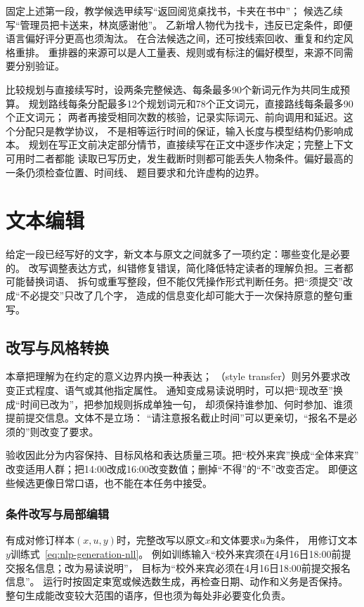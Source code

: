 固定上述第一段，教学候选甲续写“返回阅览桌找书，卡夹在书中”；
候选乙续写“管理员把卡送来，林岚感谢他”。
乙新增人物代为找卡，违反已定条件，即便语言偏好评分更高也须淘汰。
在合法候选之间，还可按线索回收、重复和约定风格重排。
重排器的来源可以是人工量表、规则或有标注的偏好模型，来源不同需要分别验证。

比较规划与直接续写时，设两条完整候选、每条最多90个新词元作为共同生成预算。
规划路线每条分配最多12个规划词元和78个正文词元，直接路线每条最多90个正文词元；
两者再接受相同次数的核验，记录实际词元、前向调用和延迟。这个分配只是教学协议，
不是相等运行时间的保证，输入长度与模型结构仍影响成本。
规划在写正文前决定部分情节，直接续写在正文中逐步作决定；完整上下文可用时二者都能
读取已写历史，发生截断时则都可能丢失人物条件。偏好最高的一条仍须检查位置、时间线、
题目要求和允许虚构的边界。

\section{文本编辑}
\label{sec:nlp-generation-editing}

给定一段已经写好的文字，新文本与原文之间就多了一项约定：哪些变化是必要的。
改写调整表达方式，纠错修复错误，简化降低特定读者的理解负担。三者都可能替换词语、
拆句或重写整段，但不能仅凭操作形式判断任务。把“须提交”改成“不必提交”只改了几个字，
造成的信息变化却可能大于一次保持原意的整句重写。

\subsection{改写与风格转换}
\label{sec:nlp-generation-paraphrase}

本章把理解为在约定的意义边界内换一种表达；
（style transfer）则另外要求改变正式程度、语气或其他指定属性。
通知变成易读说明时，可以把“现改至”换成“时间已改为”，把参加规则拆成单独一句，
却须保持谁参加、何时参加、谁须提前提交信息。文体不是立场：
“请注意报名截止时间”可以更亲切，“报名不是必须的”则改变了要求。

验收因此分为内容保持、目标风格和表达质量三项。把“校外来宾”换成“全体来宾”
改变适用人群；把14:00改成16:00改变数值；删掉“不得”的“不”改变否定。
即便这些候选更像日常口语，也不能在本任务中接受。

\subsubsection{条件改写与局部编辑}
\label{sec:nlp-generation-conditional-edit}

有成对修订样本$(x,u,y)$时，完整改写以原文$x$和文体要求$u$为条件，
用修订文本$y$训练式~\eqref{eq:nlp-generation-nll}。
例如训练输入“校外来宾须在4月16日18:00前提交报名信息；改为易读说明”，
目标为“校外来宾必须在4月16日18:00前提交报名信息”。
运行时按固定束宽或候选数生成，再检查日期、动作和义务是否保持。
整句生成能改变较大范围的语序，但也须为每处非必要变化负责。

